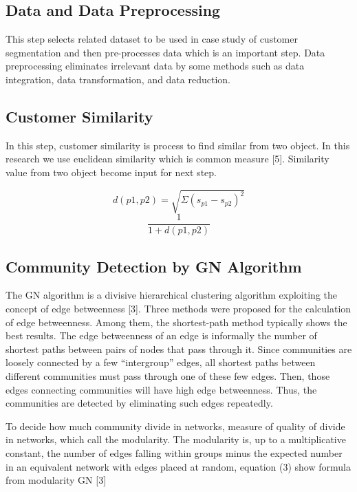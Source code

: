 \documentclass[conference]{IEEEtran}
\begin{document}
\subsection{Data and Data Preprocessing}
This step selects related dataset to be used in case study of customer segmentation and then pre-processes data which is an important step. Data preprocessing eliminates irrelevant data by some methods such as data integration, data transformation, and data reduction.

\subsection{Customer Similarity}
In this step, customer similarity is process to find similar from two object. In this research we use euclidean similarity which is common measure [5]. Similarity value from two object become input for next step.

\begin{equation}
    \label{eq:euclidean_distance}
    d( p1,p2 ) = \sqrt{ \Sigma( s_{p1}-s_{p2})^{2} }
\end{equation}
\begin{equation}
	\label{eq:euclidean_similarity}
    \frac{1}{1 + d(p1,p2)}
\end{equation}

\subsection{Community Detection by GN Algorithm}
The GN algorithm is a divisive hierarchical clustering algorithm exploiting the concept of edge betweenness [3]. Three methods were proposed for the calculation of edge betweenness. Among them, the shortest-path method typically shows the best results. The edge betweenness of an edge is informally the number of shortest paths between pairs of nodes that pass through it. Since communities are loosely connected by a few “intergroup” edges, all shortest paths between different communities must pass through one of these few edges. Then, those edges connecting communities will have high edge betweenness. Thus, the communities are detected by eliminating such edges repeatedly.

To decide how much community divide in networks, measure of quality of divide in networks, which  call the modularity. The modularity is, up to a multiplicative constant, the number of edges falling within groups minus the expected number in an equivalent network with edges placed at random, equation (3) show formula from modularity GN [3]
\end{document}
